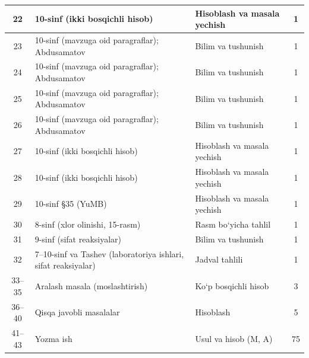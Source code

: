 \documentclass[11pt,a4paper]{article}
\begin{document}
{\begin{longtable}{|c|p{7.2cm}|p{5.4cm}|c|}
22 & 10-sinf (ikki bosqichli hisob) & Hisoblash va masala yechish & 1\\\hline
23 & 10-sinf (mavzuga oid paragraflar); Abdusamatov & Bilim va tushunish & 1\\\hline
24 & 10-sinf (mavzuga oid paragraflar); Abdusamatov & Bilim va tushunish & 1\\\hline
25 & 10-sinf (mavzuga oid paragraflar); Abdusamatov & Bilim va tushunish & 1\\\hline
26 & 10-sinf (mavzuga oid paragraflar); Abdusamatov & Bilim va tushunish & 1\\\hline
27 & 10-sinf (ikki bosqichli hisob) & Hisoblash va masala yechish & 1\\\hline
28 & 10-sinf (ikki bosqichli hisob) & Hisoblash va masala yechish & 1\\\hline
29 & 10-sinf \S{}35 (YuMB) & Hisoblash va masala yechish & 1\\\hline
30 & 8-sinf (xlor olinishi, 15-rasm) & Rasm bo`yicha tahlil & 1\\\hline
31 & 9-sinf (sifat reaksiyalar) & Bilim va tushunish & 1\\\hline
32 & 7--10-sinf va Tashev (laboratoriya ishlari, sifat reaksiyalar) & Jadval tahlili & 1\\\hline
33--35 & Aralash masala (moslashtirish) & Ko`p bosqichli hisob & 3\\\hline
36--40 & Qisqa javobli masalalar & Hisoblash & 5\\\hline
41--43 & Yozma ish & Usul va hisob (M, A) & 75\\\hline
\end{longtable}}
\end{document}
